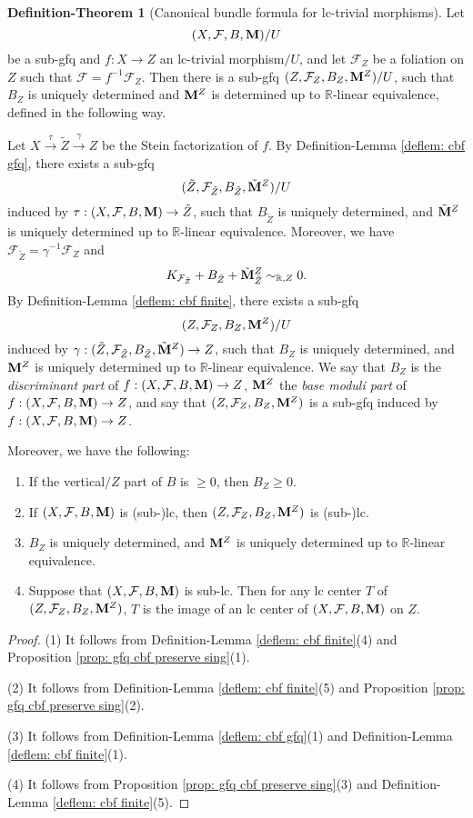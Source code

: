 \documentclass[11pt]{amsart}
\numberwithin{equation}{section}
\newcommand{\Mm}{{\bf{M}}}
\newcommand{\Rr}{\mathbb{R}}
\newcommand{\Ff}{\mathcal{F}}
\theoremstyle{definition}
\theoremstyle{definition}
\newtheorem{defthm}[thm]{Definition-Theorem}
\theoremstyle{definition}
\begin{document}
\begin{defthm}[Canonical bundle formula for lc-trivial morphisms]\label{defthm: cbf lctrivial morphism}
    Let $$(X,\Ff,B,\Mm)/U$$ be a sub-gfq and $f: X\rightarrow Z$ an lc-trivial morphism$/U$, and let $\Ff_Z$ be a foliation on $Z$ such that $\Ff=f^{-1}\Ff_Z$. Then there is a sub-gfq $(Z,\Ff_Z,B_Z,\Mm^Z)/U$, such that $B_Z$ is uniquely determined and $\Mm^Z$ is determined up to $\Rr$-linear equivalence, defined in the following way.

    Let $X\xrightarrow{\tau}\tilde Z\xrightarrow{\gamma}Z$ be the Stein factorization of $f$. By Definition-Lemma \ref{deflem: cbf gfq}, there exists a sub-gfq $$(\tilde Z,\Ff_{\tilde Z},B_{\tilde Z},\tilde\Mm^Z)/U$$
    induced by $\tau: (X,\Ff,B,\Mm)\rightarrow\tilde Z$, such that $B_{\tilde Z}$ is uniquely determined, and  $\tilde\Mm^Z$ is uniquely determined up to $\Rr$-linear equivalence. Moreover, we have $\Ff_{\tilde Z}=\gamma^{-1}\Ff_Z$ and
    $$K_{\Ff_{\tilde Z}}+B_{\tilde Z}+\tilde\Mm^Z_{\tilde Z}\sim_{\mathbb R,Z}0.$$
    By Definition-Lemma \ref{deflem: cbf finite}, there exists a sub-gfq  
  $$(Z,\Ff_Z,B_Z,\Mm^Z)/U$$
  induced by $\gamma: (\tilde Z,\Ff_{\tilde Z},B_{\tilde Z},\tilde\Mm^Z)\rightarrow Z$, such that $B_Z$  is uniquely determined, and  $\Mm^Z$ is uniquely determined up to $\Rr$-linear equivalence. We say that $B_Z$ is the \emph{discriminant part} of $f: (X,\Ff,B,\Mm)\rightarrow Z$, $\Mm^Z$ the \emph{base moduli part} of  $f: (X,\Ff,B,\Mm)\rightarrow Z$, and say that $(Z,\Ff_Z,B_Z,\Mm^Z)$ is a sub-gfq induced by $f: (X,\Ff,B,\Mm)\rightarrow Z$.

 Moreover, we have the following:
\begin{enumerate}
\item If the vertical$/Z$ part of $B$ is $\geq 0$, then $B_Z\geq 0$.
\item  If $(X,\Ff,B,\Mm)$ is (sub-)lc, then $(Z,\Ff_Z,B_Z,\Mm^Z)$ is (sub-)lc.
\item $B_Z$ is uniquely determined, and $\Mm^Z$ is uniquely determined up to $\Rr$-linear equivalence.
\item Suppose that $(X,\Ff,B,\Mm)$ is sub-lc. Then for any lc center $T$ of $(Z,\Ff_Z,B_Z,\Mm^Z)$, $T$ is the image of an lc center of $(X,\Ff,B,\Mm)$ on $Z$.
\end{enumerate}
\end{defthm}
\begin{proof}
(1) It follows from Definition-Lemma \ref{deflem: cbf finite}(4) and Proposition \ref{prop: gfq cbf preserve sing}(1).

(2) It follows from Definition-Lemma \ref{deflem: cbf finite}(5) and Proposition \ref{prop: gfq cbf preserve sing}(2).

(3) It follows from Definition-Lemma \ref{deflem: cbf gfq}(1) and Definition-Lemma \ref{deflem: cbf finite}(1).

(4) It follows from Proposition \ref{prop: gfq cbf preserve sing}(3) and Definition-Lemma \ref{deflem: cbf finite}(5).
\end{proof}
\end{document}
